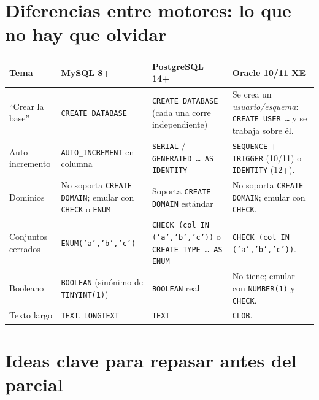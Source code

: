\documentclass[11pt,a4paper]{article}
\begin{document}
\section{Diferencias entre motores: lo que no hay que olvidar}

\begin{center}
\begin{tabular}{@{}p{3.4cm} p{3.6cm} p{3.6cm} p{3.6cm}@{}}
\toprule
\textbf{Tema} & \textbf{MySQL 8+} & \textbf{PostgreSQL 14+} &
\textbf{Oracle 10/11 XE} \\
\midrule
``Crear la base'' & \texttt{CREATE DATABASE} &
\texttt{CREATE DATABASE} (cada una corre independiente) &
Se crea un \emph{usuario/esquema}: \texttt{CREATE USER \dots} y se
trabaja sobre él. \\
\addlinespace
Auto incremento & \texttt{AUTO\_INCREMENT} en columna &
\texttt{SERIAL} / \texttt{GENERATED \dots\ AS IDENTITY} &
\texttt{SEQUENCE} + \texttt{TRIGGER} (10/11) o \texttt{IDENTITY} (12+). \\
\addlinespace
Dominios & No soporta \texttt{CREATE DOMAIN}; emular con
\texttt{CHECK} o \texttt{ENUM} & Soporta \texttt{CREATE DOMAIN} estándar &
No soporta \texttt{CREATE DOMAIN}; emular con \texttt{CHECK}. \\
\addlinespace
Conjuntos cerrados & \texttt{ENUM('a','b','c')} &
\texttt{CHECK (col IN ('a','b','c'))} o \texttt{CREATE TYPE \dots\ AS ENUM} &
\texttt{CHECK (col IN ('a','b','c'))}. \\
\addlinespace
Booleano & \texttt{BOOLEAN} (sinónimo de \texttt{TINYINT(1)}) &
\texttt{BOOLEAN} real & No tiene; emular con \texttt{NUMBER(1)} y
\texttt{CHECK}. \\
\addlinespace
Texto largo & \texttt{TEXT}, \texttt{LONGTEXT} & \texttt{TEXT} &
\texttt{CLOB}. \\
\bottomrule
\end{tabular}
\end{center}

\section{Ideas clave para repasar antes del parcial}
\end{document}

